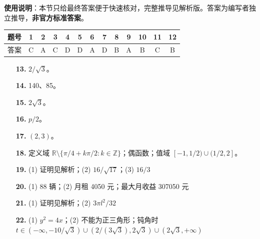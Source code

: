 
\begin{gknotice}
\textbf{使用说明}：本节只给最终答案便于快速核对，完整推导见解析版。答案为编写者独立推导，\textbf{非官方标准答案}。
\end{gknotice}

\begin{center}\begin{tabular}{ccccccccccccc}
\toprule
题号 & 1 & 2 & 3 & 4 & 5 & 6 & 7 & 8 & 9 & 10 & 11 & 12 \\
\midrule
答案 & C & A & C & D & D & A & D & B & A & B & C & B \\
\bottomrule
\end{tabular}\end{center}

\begin{itemize}[leftmargin=2.6em]
  \item[\textbf{13.}] $2/\sqrt3$。
  \item[\textbf{14.}] 140、85。
  \item[\textbf{15.}] $2\sqrt3$。
  \item[\textbf{16.}] $p/2$。
\end{itemize}

\begin{itemize}[leftmargin=2.6em]
  \item[\textbf{17.}] $(2,3)$。
  \item[\textbf{18.}] 定义域 $\mathbb R\setminus\{\pi/4+k\pi/2:k\in\mathbb Z\}$；偶函数；值域 $[-1,1/2)\cup(1/2,2]$。
  \item[\textbf{19.}] (1) 证明见解析；(2) $16/\sqrt{17}$；(3) $16/3$
  \item[\textbf{20.}] (1) 88 辆；(2) 月租 4050 元；最大月收益 307050 元
  \item[\textbf{21.}] (1) 证明见解析；(2) $3\pi l^2/32$
  \item[\textbf{22.}] (1) $y^2=4x$；(2) 不能为正三角形；钝角时 $t\in(-\infty,-10/\sqrt3)\cup(2/(3\sqrt3),2\sqrt3)\cup(2\sqrt3,+\infty)$
\end{itemize}
